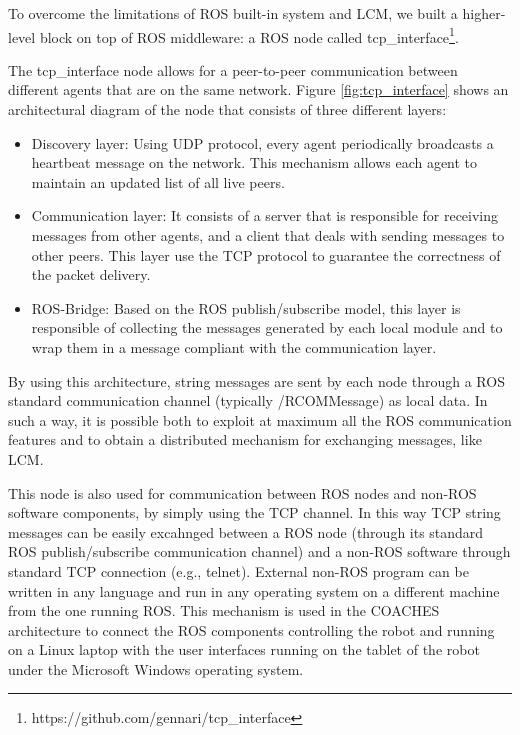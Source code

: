 To overcome the limitations of ROS built-in system and LCM, we built a higher-level block on top of ROS middleware: a ROS node called tcp\_interface\footnote{https://github.com/gennari/tcp\_interface}.

The tcp\_interface node allows for a peer-to-peer communication between different agents that are on the same network. Figure \ref{fig:tcp_interface} shows an architectural diagram of the node that consists of three different layers:
	\begin{itemize}
		\item Discovery layer:
			Using UDP protocol, every agent periodically broadcasts a heartbeat message on the network. This mechanism allows each agent to maintain an updated list of all live peers.
		\item Communication layer:
			It consists of a server that is responsible for receiving messages from other agents, and a client that deals with sending messages to other peers. This layer use the TCP protocol to guarantee the correctness of the packet delivery.
		\item ROS-Bridge:
			Based on the ROS publish/subscribe model, this layer is responsible of collecting the messages generated by each local module and to wrap them in a message compliant with the communication layer.
	
	\end{itemize}


By using this architecture, string messages are sent by each node through a ROS standard communication channel (typically /RCOMMessage) as local data. In such a way, it is possible both to exploit at maximum all the ROS communication features and to obtain a distributed mechanism for exchanging messages, like LCM. 
	
This node is also used for communication between ROS nodes and non-ROS software components, by simply using the TCP channel.
In this way TCP string messages can be easily excahnged between a ROS node (through its standard ROS publish/subscribe communication channel) and a non-ROS software through standard TCP connection (e.g., telnet).
External non-ROS program can be written in any language and run in any operating system on a different machine from the one running ROS.
This mechanism is used in the COACHES architecture to connect the ROS components controlling the robot and running on a Linux laptop with the user interfaces running on the tablet of the robot under the Microsoft Windows operating system.









